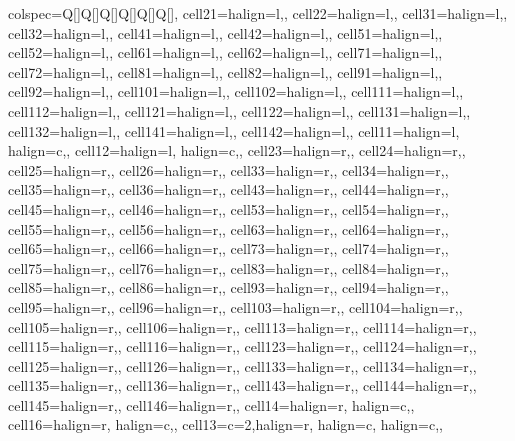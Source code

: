 \begin{table}
  \caption{Demographics of Japanese Americans in 1940 Census and WRA records}
\centering
\begin{tblr}[         %
]                     %
{                     %
colspec={Q[]Q[]Q[]Q[]Q[]Q[]},
cell{2}{1}={}{halign=l,},
cell{2}{2}={}{halign=l,},
cell{3}{1}={}{halign=l,},
cell{3}{2}={}{halign=l,},
cell{4}{1}={}{halign=l,},
cell{4}{2}={}{halign=l,},
cell{5}{1}={}{halign=l,},
cell{5}{2}={}{halign=l,},
cell{6}{1}={}{halign=l,},
cell{6}{2}={}{halign=l,},
cell{7}{1}={}{halign=l,},
cell{7}{2}={}{halign=l,},
cell{8}{1}={}{halign=l,},
cell{8}{2}={}{halign=l,},
cell{9}{1}={}{halign=l,},
cell{9}{2}={}{halign=l,},
cell{10}{1}={}{halign=l,},
cell{10}{2}={}{halign=l,},
cell{11}{1}={}{halign=l,},
cell{11}{2}={}{halign=l,},
cell{12}{1}={}{halign=l,},
cell{12}{2}={}{halign=l,},
cell{13}{1}={}{halign=l,},
cell{13}{2}={}{halign=l,},
cell{14}{1}={}{halign=l,},
cell{14}{2}={}{halign=l,},
cell{1}{1}={}{halign=l, halign=c,},
cell{1}{2}={}{halign=l, halign=c,},
cell{2}{3}={}{halign=r,},
cell{2}{4}={}{halign=r,},
cell{2}{5}={}{halign=r,},
cell{2}{6}={}{halign=r,},
cell{3}{3}={}{halign=r,},
cell{3}{4}={}{halign=r,},
cell{3}{5}={}{halign=r,},
cell{3}{6}={}{halign=r,},
cell{4}{3}={}{halign=r,},
cell{4}{4}={}{halign=r,},
cell{4}{5}={}{halign=r,},
cell{4}{6}={}{halign=r,},
cell{5}{3}={}{halign=r,},
cell{5}{4}={}{halign=r,},
cell{5}{5}={}{halign=r,},
cell{5}{6}={}{halign=r,},
cell{6}{3}={}{halign=r,},
cell{6}{4}={}{halign=r,},
cell{6}{5}={}{halign=r,},
cell{6}{6}={}{halign=r,},
cell{7}{3}={}{halign=r,},
cell{7}{4}={}{halign=r,},
cell{7}{5}={}{halign=r,},
cell{7}{6}={}{halign=r,},
cell{8}{3}={}{halign=r,},
cell{8}{4}={}{halign=r,},
cell{8}{5}={}{halign=r,},
cell{8}{6}={}{halign=r,},
cell{9}{3}={}{halign=r,},
cell{9}{4}={}{halign=r,},
cell{9}{5}={}{halign=r,},
cell{9}{6}={}{halign=r,},
cell{10}{3}={}{halign=r,},
cell{10}{4}={}{halign=r,},
cell{10}{5}={}{halign=r,},
cell{10}{6}={}{halign=r,},
cell{11}{3}={}{halign=r,},
cell{11}{4}={}{halign=r,},
cell{11}{5}={}{halign=r,},
cell{11}{6}={}{halign=r,},
cell{12}{3}={}{halign=r,},
cell{12}{4}={}{halign=r,},
cell{12}{5}={}{halign=r,},
cell{12}{6}={}{halign=r,},
cell{13}{3}={}{halign=r,},
cell{13}{4}={}{halign=r,},
cell{13}{5}={}{halign=r,},
cell{13}{6}={}{halign=r,},
cell{14}{3}={}{halign=r,},
cell{14}{4}={}{halign=r,},
cell{14}{5}={}{halign=r,},
cell{14}{6}={}{halign=r,},
cell{1}{4}={}{halign=r, halign=c,},
cell{1}{6}={}{halign=r, halign=c,},
cell{1}{3}={c=2,}{halign=r, halign=c, halign=c,},
}
\end{tblr}
\end{table}
